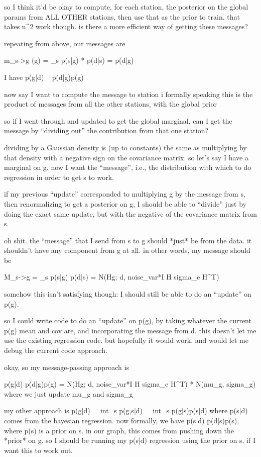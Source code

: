 \documentclass{article}
\begin{document}
so I think it'd be okay to compute, for each station, the posterior on the global params from ALL OTHER stations, then use that as the prior to train. that takes n^2 work though. is there a more efficient way of getting these messages?

repeating from above, our messages are

m_s->g (g) = \int_s p(s|g) * p(d|s)
           = p(d|g)


I have p(g|d) ~ p(d|g)p(g)


now say I want to compute the message to station i
formally speaking this is the product of messages from all the other stations, with the global prior

so if I went through and updated to get the global marginal, can I get the message by ``dividing out'' the contribution from that one station?

dividing by a Gaussian density is (up to constants) the same as multiplying by that density with a negative sign on the covariance matrix. 
so let's say I have a marginal on g. now I want the ``message'', i.e., the distribution with which to do regression in order to get s to work. 

if my previous ``update'' corresponded to multiplying g by the message from s, then renormalizing to get a posterior on g, I should be able to ``divide'' just by doing the exact same update, but with the negative of the covariance matrix from s.

oh shit.
the ``message'' that I send from s to g should *just* be from the data. it shouldn't have any component from g at all. 
in other words, my message should be

M_s->g = \int_s p(s|g) p(d|s)
= N(Hg; d, noise_var*I H sigma_e H^T)

somehow this isn't satisfying though: I should still be able to do an ``update'' on p(g).

so I could write code to do an ``update'' on p(g), by taking whatever the current p(g) mean and cov are, and incorporating the message from d. this doesn't let me use the existing regression code. but hopefully it would work, and would let me debug the current code approach.

okay, so my message-passing approach is

p(g|d) \propto p(d|g)p(g)
             = N(Hg; d, noise_var*I H sigma_e H^T) * N(mu_g, sigma_g)
       where we just update mu_g and sigma_g

my other approach is
p(g|d) = int_s p(g,s|d)
       = int_s p(g|s)p(s|d)
where p(s|d) comes from the bayesian regression. now formally, we have p(s|d) \propto p(d|s)p(s),
where p(s) is a prior on s. in our graph, this comes from pushing down the *prior* on g. 
so I should be running my p(s|d) regression using the prior on s, if I want this to work out.
\end{document}
